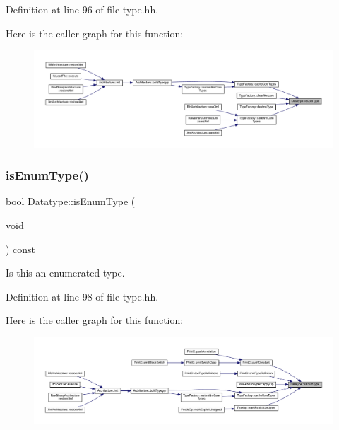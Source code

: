 Definition at line 96 of file type.\+hh.

Here is the caller graph for this function\+:
\nopagebreak
\begin{figure}[H]
\begin{center}
\leavevmode
\includegraphics[width=350pt]{class_datatype_a15ae1519c41266c3af2b06392b75e1ba_icgraph}
\end{center}
\end{figure}
\mbox{\label{class_datatype_adb1f8990ba5c131acbefbfcdb1686708}} 
\subsubsection{\texorpdfstring{isEnumType()}{isEnumType()}}
{\footnotesize\ttfamily bool Datatype\+::is\+Enum\+Type (\begin{DoxyParamCaption}\item[{void}]{ }\end{DoxyParamCaption}) const\hspace{0.3cm}{\ttfamily [inline]}}



Is this an enumerated type. 



Definition at line 98 of file type.\+hh.

Here is the caller graph for this function\+:
\nopagebreak
\begin{figure}[H]
\begin{center}
\leavevmode
\includegraphics[width=350pt]{class_datatype_adb1f8990ba5c131acbefbfcdb1686708_icgraph}
\end{center}
\end{figure}
\mbox{\label{class_datatype_a5cb816c9455528b396ad1b6cbf16dbdf}} 
